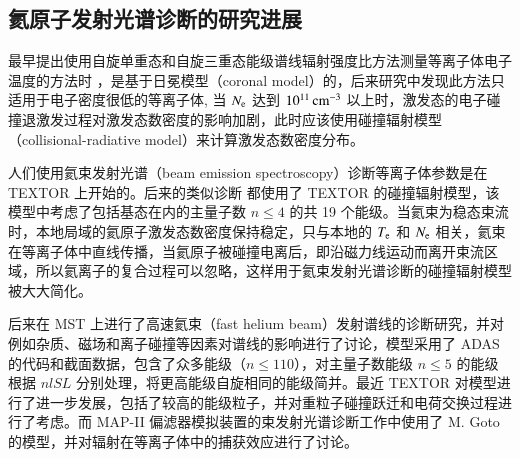 \subsection{氦原子发射光谱诊断的研究进展}
\label{sec:chap01:research-history}

最早提出使用自旋单重态和自旋三重态能级谱线辐射强度比方法测量等离子体电子温度的方法时
\cite{Sovie1964-He-coronal,Vries1966-He-coronal}，是基于日冕模型（coronal model）的，后来研究中发现此方法只适用于电子密度很低的等离子体, 当 $N_{\rm e}$ 达到 $10^{11}\,{\rm cm}^{-3}$ 以上时，激发态的电子碰撞退激发过程对激发态数密度的影响加剧，此时应该使用碰撞辐射模型（collisional-radiative model）来计算激发态数密度分布\cite{Newe1966-He-CRRecommend}。

人们使用氦束发射光谱（beam emission spectroscopy）诊断等离子体参数是在 TEXTOR\cite{Schweer1992174} 上开始的。后来的类似诊断\cite{Davies1997-HeBES-JET,Field-HeBES-COMPASSD,Hidalgo-HeBES-TJII}
都使用了 TEXTOR 的碰撞辐射模型，该模型中考虑了包括基态在内的主量子数 $n\le 4$ 的共 19 个能级。当氦束为稳态束流时，本地局域的氦原子激发态数密度保持稳定，只与本地的 $T_{\rm e}$ 和 $N_{\rm e}$ 相关，氦束在等离子体中直线传播，当氦原子被碰撞电离后，即沿磁力线运动而离开束流区域，所以氦离子的复合过程可以忽略，这样用于氦束发射光谱诊断的碰撞辐射模型被大大简化。

后来在 MST 上进行了高速氦束（fast helium beam）发射谱线的诊断研究\cite{Ahn2007-He-BES}，并对例如杂质、磁场和离子碰撞等因素对谱线的影响进行了讨论，模型采用了 ADAS\cite{ADAS} 的代码和截面数据，包含了众多能级（$n\le 110$），对主量子数能级 $n\le5$ 的能级根据 $nlSL$ 分别处理，将更高能级自旋相同的能级简并。最近 TEXTOR 对模型进行了进一步发展\cite{Schmitz2008}，包括了较高的能级粒子，并对重粒子碰撞跃迁和电荷交换过程进行了考虑。而 MAP-II 偏滤器模拟装置\cite{Iida2010-HeBES-MAPII}的束发射光谱诊断工作中使用了 M. Goto 的模型\cite{Goto2003-HeCRM}，并对辐射在等离子体中的捕获效应进行了讨论。


